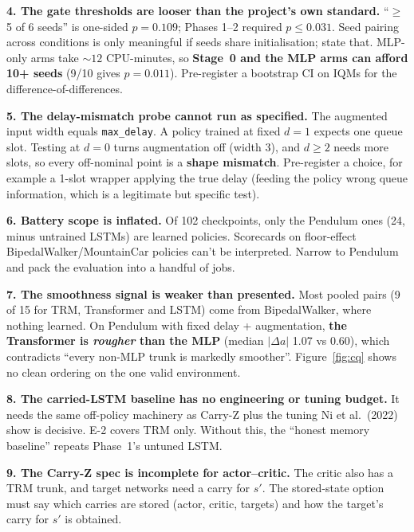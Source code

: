 \documentclass[11pt]{article}
\begin{document}
\textbf{4. The gate thresholds are looser than the project's own standard.} ``$\ge$5 of 6 seeds'' is one-sided $p=0.109$; Phases 1--2 required $p\le0.031$. Seed pairing across conditions is only meaningful if seeds share initialisation; state that. MLP-only arms take ${\sim}12$ CPU-minutes, so \textbf{Stage~0 and the MLP arms can afford 10+ seeds} (9/10 gives $p=0.011$). Pre-register a bootstrap CI on IQMs for the difference-of-differences.

\textbf{5. The delay-mismatch probe cannot run as specified.} The augmented input width equals \texttt{max\_delay}. A policy trained at fixed $d=1$ expects one queue slot. Testing at $d=0$ turns augmentation off (width 3), and $d\ge2$ needs more slots, so every off-nominal point is a \textbf{shape mismatch}. Pre-register a choice, for example a 1-slot wrapper applying the true delay (feeding the policy wrong queue information, which is a legitimate but specific test).

\textbf{6. Battery scope is inflated.} Of 102 checkpoints, only the Pendulum ones (24, minus untrained LSTMs) are learned policies. Scorecards on floor-effect BipedalWalker/MountainCar policies can't be interpreted. Narrow to Pendulum and pack the evaluation into a handful of jobs.

\textbf{7. The smoothness signal is weaker than presented.} Most pooled pairs (9 of 15 for TRM, Transformer and LSTM) come from BipedalWalker, where nothing learned. On Pendulum with fixed delay + augmentation, \textbf{the Transformer is \emph{rougher} than the MLP} (median $|\Delta a|$ 1.07 vs 0.60), which contradicts ``every non-MLP trunk is markedly smoother''. Figure~\ref{fig:cq} shows no clean ordering on the one valid environment.

\textbf{8. The carried-LSTM baseline has no engineering or tuning budget.} It needs the same off-policy machinery as Carry-Z plus the tuning Ni et al.\ (2022) show is decisive. E-2 covers TRM only. Without this, the ``honest memory baseline'' repeats Phase~1's untuned LSTM.

\textbf{9. The Carry-Z spec is incomplete for actor--critic.} The critic also has a TRM trunk, and target networks need a carry for $s'$. The stored-state option must say which carries are stored (actor, critic, targets) and how the target's carry for $s'$ is obtained.
\end{document}
